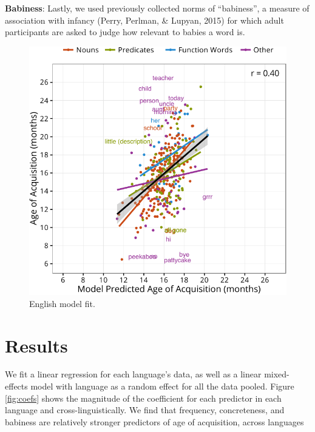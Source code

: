 \documentclass[10pt, letterpaper]{article}
\newenvironment{CodeChunk}{}{}
\begin{document}
\textbf{Babiness}: Lastly, we used previously collected norms of
``babiness'', a measure of association with infancy (Perry, Perlman, \&
Lupyan, 2015) for which adult participants are asked to judge how
relevant to babies a word is.

\begin{CodeChunk}
\begin{figure}[tb]

{\centering \includegraphics{figs/fit-1} 

}

\caption[English model fit]{English model fit.}\label{fig:fit}
\end{figure}
\end{CodeChunk}

\section{Results}\label{results}

We fit a linear regression for each language's data, as well as a linear
mixed-effects model with language as a random effect for all the data
pooled. Figure \ref{fig:coefs} shows the magnitude of the coefficient
for each predictor in each language and cross-linguistically. We find
that frequency, concreteness, and babiness are relatively stronger
predictors of age of acquisition, across languages
\end{document}
